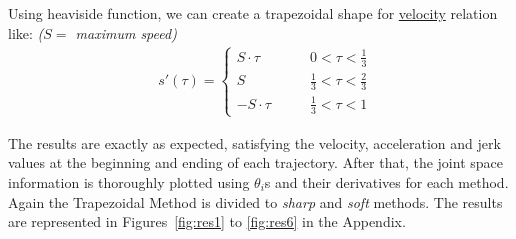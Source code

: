 \documentclass[conference]{IEEEtran}
\begin{document}
Using heaviside function, we can create a trapezoidal shape for \underline{velocity} relation like: \textit{($S =$ maximum speed)}
\begin{align*}
     & s'(\tau) = \begin{cases}
                      S \cdot \tau  & \quad\quad 0 < \tau < \frac{1}{3}           \\[15pt]
                      S             & \quad\quad \frac{1}{3} < \tau < \frac{2}{3} \\[15pt]
                      -S \cdot \tau & \quad\quad \frac{1}{3} < \tau < 1
                  \end{cases}
\end{align*}

The results are exactly as expected, satisfying the velocity, acceleration and jerk values at the beginning and ending of each trajectory. After that, the joint space information is thoroughly plotted using $\theta_i$s and their derivatives for each method. Again the Trapezoidal Method is divided to \textit{sharp} and \textit{soft} methods. The results are represented in Figures~\ref{fig:res1} to \ref{fig:res6} in the Appendix.
\end{document}
